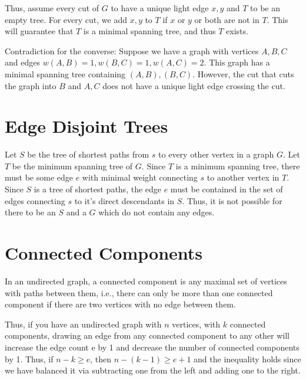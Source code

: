 \documentclass[14pt, letterpaper]{article}
\begin{document}
Thus, assume every cut of $G$ to have a unique light edge $x, y$ and $T$ to be
an empty tree. For every cut, we add $x, y$ to $T$ if $x$ or $y$ or both are
not in $T$. This will guarantee that $T$ is a minimal spanning tree, and thus
$T$ exists.

Contradiction for the converse: Suppose we have a graph with vertices $A, B, C$ 
and edges $w(A, B) = 1, w(B, C) = 1, w(A, C) = 2$. This graph has a minimal 
spanning tree containing $(A, B), (B, C)$. However, the cut that cuts the graph
into $B$ and $A, C$ does not have a unique light edge crossing the cut.

\section{Edge Disjoint Trees}
Let $S$ be the tree of shortest paths from $s$ to every other vertex in a graph
$G$. Let $T$ be the minimum spanning tree of $G$. Since $T$ is a minimum
spanning tree, there must be some edge $e$ with minimal weight connecting $s$
to another vertex in $T$. Since $S$ is a tree of shortest paths, the edge $e$
must be contained in the set of edges connecting $s$ to it's direct descendants
in $S$. Thus, it is not possible for there to be an $S$ and a $G$ which do not
contain any edges.


\section{Connected Components}
In an undirected graph, a connected component is any maximal set of vertices
with paths between them, i.e., there can only be more than one connected
component if there are two vertices with no edge between them.

Thus, if you have an undirected graph with $n$ vertices, with $k$ connected
components, drawing an edge from any connected component to any other will
increase the edge count e by 1 and decrease the number of connected components 
by 1. Thus, if $n - k \geq e$, then $n - (k - 1) \geq e + 1$ and the inequality
holds since we have balanced it via subtracting one from the left and adding 
one to the right.
\end{document}
